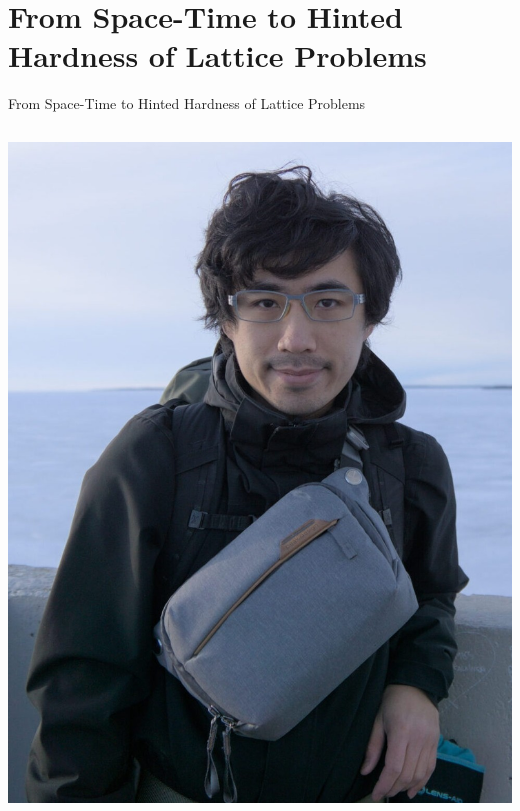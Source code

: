 \documentclass[xcolor=table,10pt,aspectratio=169]{beamer}
\begin{document}
\section{From Space-Time to Hinted Hardness of Lattice Problems}
\label{sec:orgb34f133}
\begin{frame}[label={sec:orgad49e0e}]{From Space-Time to Hinted Hardness of Lattice Problems}
\begin{columns}
\begin{column}{0.5\columnwidth}
\begin{center}
\includegraphics[keepaspectratio,frame,height=0.6\textheight]{./russell.jpg}
\end{center}
\end{column}



\end{columns}
\end{frame}
\end{document}
